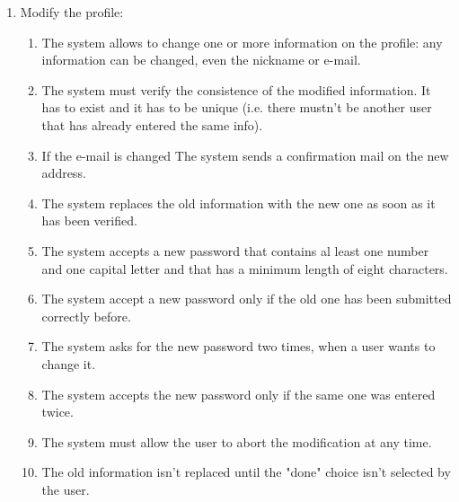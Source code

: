 \begin{enumerate}
\item Modify the profile:
\begin{enumerate}
\item The system allows to change one or more information on the profile: any information can be changed, even the nickname or e-mail.
\item The system must verify the consistence of the modified information. It has to exist and it has to be unique (i.e. there mustn't be another user that has already entered the same info). 
\item If the e-mail is changed The system sends a confirmation mail on the new address.
\item The system replaces the old information with the new one as soon as it has been verified.
\item The system accepts a new password that contains al least one number and one capital letter and that has a minimum length of eight characters.
\item The system accept a new password only if the old one has been submitted correctly before.
\item The system asks for the new password two times, when a user wants to change it.
\item The system accepts the new password only if the same one was entered twice.
\item The system must allow the user to abort the modification at any time.
\item The old information isn't  replaced until the "done" choice isn't selected by the user.
\end{enumerate}




\end{enumerate}




